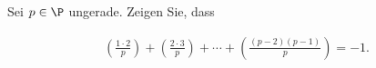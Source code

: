 
\begin{exercise}

Sei $p \in \P$ ungerade. Zeigen Sie, dass

\begin{align}
    \left( \frac{1\cdot 2}{p} \right) + 
    \left( \frac{2 \cdot 3}{p} \right) +
    \cdots +
    \left(\frac{(p-2)(p-1)}{p} \right) = -1.
\end{align}

\end{exercise}


\begin{solution}

\phantom{}

\end{solution}

